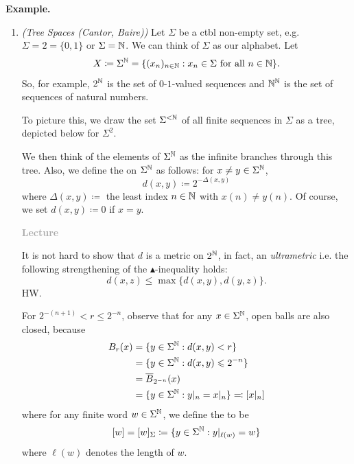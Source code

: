 \documentclass[14pt,oneside]{extarticle}
\newcounter{lecture}
\newcommand{\lecture}{%
  \refstepcounter{lecture}%
  \begin{flushright}
    \textcolor{darkgray}{\textbf{Lecture \thelecture}}
  \end{flushright}%
}
\newenvironment{example}{
    \par
    \vspace{5pt}
    \noindent\textbf{Example.}
    \begin{tcolorbox}[
        blanker, breakable, left=5mm, parbox=false,
        before upper={\parindent15pt},
        after skip=10pt,
        borderline west={1mm}{0pt}{solarized-magenta!50}]
}{
    \end{tcolorbox}
    \vspace{5pt}
}
\begin{document}
\begin{example}
\begin{enumerate}[label=$\circ$, leftmargin=*, itemsep=1em]
      \textbf{Claim:} The , $d_u$, is indeed a metric. 
      
      \noindent\soln{} For $\blacktriangle$-inequality, observe that for each $f,g,h \in B(X)$ and $x \in X$,
      \begin{align*}
        |f(x) - h(x)| & \leq |f(x) -g(x) + g(x) - h(x)| \\
                      & \leq d_u(f,g) + d_u(g,h).
      \end{align*}
      Since this holds for all $x \in X$, and  by definition of the supremum as the least upper bound, we get
      \[d_u(f,h) = \sup_{x\in X}|f(x) - h(x)| \leq d_u(f,g) + d_u(g,h).\]

      \item \textit{(Tree Spaces (Cantor, Baire))} Let $\Sigma$ be a ctbl non-empty set, e.g. $\Sigma = 2 = \{0,1\}$ or $\Sigma = \mathbb{N}$. We can think of $\Sigma$ as our alphabet. Let \[X \coloneqq \Sigma^{\mathbb{N}} = \{(x_n)_{n \in \mathbb{N}}: x_n \in \Sigma \text{ for all } n \in \mathbb{N}\}.\]
      So, for example, $2^{\mathbb{N}}$ is the set of $0$-$1$-valued sequences and $\mathbb{N}^{\mathbb{N}}$ is the set of sequences of natural numbers.

      To picture this, we draw the set $\Sigma^{<\mathbb{N}}$ of all finite sequences in $\Sigma$ as a tree, depicted below for $\Sigma^2$.

      \pic 

      We then think of the elements of $\Sigma^{\mathbb{N}}$ as the infinite branches through this tree. Also, we define the  on $\Sigma^{\mathbb{N}}$ as follows: for $x \neq y \in \Sigma^{\mathbb{N}}$, 
      \[d(x,y) \coloneqq 2^{- \Delta(x,y)}\]
      where $\Delta(x,y) \coloneqq$ the least index $n \in \mathbb{N}$ with $x(n) \neq y(n)$. Of course, we set $d(x,y) \coloneqq 0$ if $x = y$.

      \lecture

      It is not hard to show that $d$ is a metric on $2^{\mathbb{N}}$, in fact, an \textit{ultrametric} i.e. the following strengthening of the $\blacktriangle$-inequality holds:
      \[d(x,z) \leq \max\{d(x,y), d(y,z)\}.\]
      \noindent\soln{} HW.
      
      For $2^{-(n+1)} < r \leq 2^{-n}$, observe that for any $x \in \Sigma^{\mathbb{N}}$, open balls are also closed, because
      \begin{align*}
        B_r(x) & = \{y \in \Sigma^{\mathbb{N}} : d(x,y) < r\}\\
               & = \{y \in \Sigma^{\mathbb{N}}: d(x,y) \leqslant 2^{-n}\} \\
               & = \overline{B}_{2^{-n}}(x) \\
               & = \{y \in \Sigma^{\mathbb{N}} : y|_n = x|_n\} \eqqcolon [x|_n]
      \end{align*}
      where for any finite word $w \in \Sigma^{\mathbb{N}}$, we define the  to be 
      \[[w] = [w]_\Sigma \coloneqq \{y \in \Sigma^{\mathbb{N}}: y|_{\ell(w)} = w\}\]
      where $\ell(w)$ denotes the length of $w$.


\end{enumerate}
\end{example}
\end{document}
